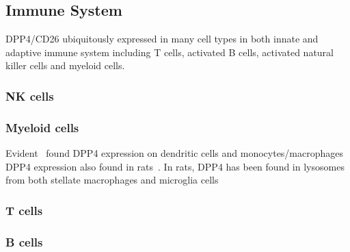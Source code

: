 \subsection{Immune System}
DPP4/CD26 ubiquitously expressed in many cell types in both innate and adaptive immune system including T cells, activated B cells, activated natural killer cells and myeloid cells.~\cite{Abbott1994,Shingu2003,Hong1989,Gutschmidt1981,Dikov2004,Bühling1995,Tanaka1992,Gorrell1991}  

\subsubsection{NK cells}

\subsubsection{Myeloid cells}
Evident~\cite{Zhong2013,Gliddon2002} found DPP4 expression on dendritic cells and monocytes/macrophages DPP4 expression also found in rats~\cite{Epardaud2004, Ellingsen2007}. In rats, DPP4 has been found in lysosomes from both stellate macrophages and microglia cells 

\subsubsection{T cells}
\subsubsection{B cells}
